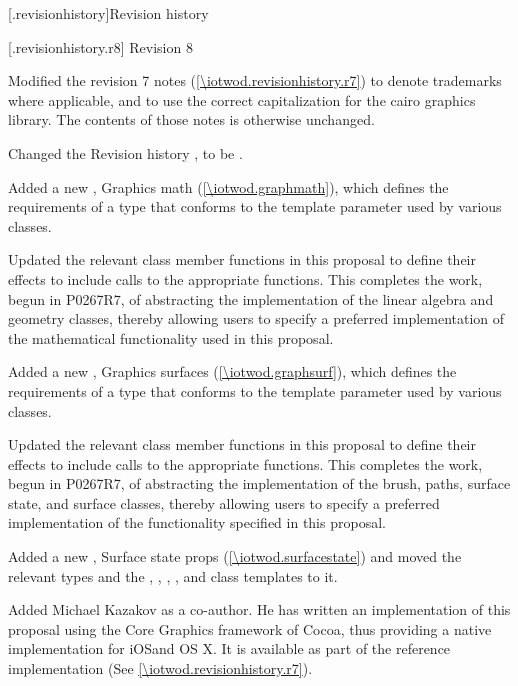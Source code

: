 \addtocounter{chapter}{-1} %
[\iotwod.revisionhistory]{Revision history}

 [\iotwod.revisionhistory.r8] {Revision 8}

\pnum
Modified the revision 7 notes (\ref{\iotwod.revisionhistory.r7}) to denote trademarks where applicable, and to use the correct capitalization for the cairo graphics library. The contents of those notes is otherwise unchanged.

\pnum
Changed the Revision history \clause, to be .

\pnum
Added a new \clause, Graphics math (\ref{\iotwod.graphmath}), which defines the requirements of a type that conforms to the \graphicsmathtemplparam template parameter used by various classes.

\pnum
Updated the relevant class member functions in this proposal to define their effects to include calls to the appropriate \graphicsmathtemplparam functions. This completes the work, begun in P0267R7, of abstracting the implementation of the linear algebra and geometry classes, thereby allowing users to specify a preferred implementation of the mathematical functionality used in this proposal.

\pnum
Added a new \clause, Graphics surfaces (\ref{\iotwod.graphsurf}), which defines the requirements of a type that conforms to the \graphicssurfacestemplparam template parameter used by various classes.

\pnum
Updated the relevant class member functions in this proposal to define their effects to include calls to the appropriate \graphicssurfacestemplparam functions. This completes the work, begun in P0267R7, of abstracting the implementation of the brush, paths, surface state, and surface classes, thereby allowing users to specify a preferred implementation of the functionality specified in this proposal.

\pnum
Added a new \clause, Surface state props (\ref{\iotwod.surfacestate}) and moved the relevant  types and the , , , , and  class templates to it. 

\pnum
Added Michael Kazakov as a co-author. He has written an implementation of this proposal using the Core Graphics framework of Cocoa\textregistered, thus providing a native implementation for iOS\textregistered and OS X\textregistered. It is available as part of the reference implementation (See \ref{\iotwod.revisionhistory.r7}).

